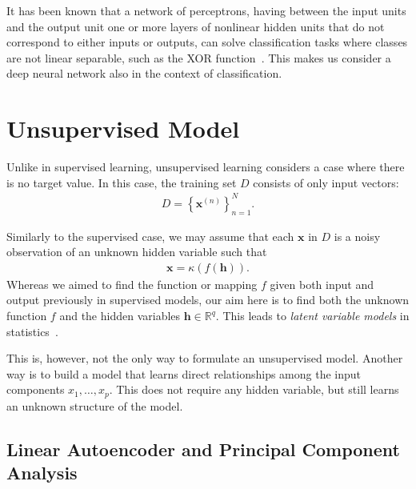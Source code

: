 \documentclass{now}
\newcommand{\vect}[1]{\mathbf{#1}}
\newcommand{\vh}[0]{\vect{h}}
\newcommand{\vx}[0]{\vect{x}}
\newcommand{\RR}[0]{\mathbb{R}}
\begin{document}
It has been known that a network of perceptrons, having between the input units
and the output unit one or more layers of nonlinear hidden units that do not
correspond to either inputs or outputs, can solve classification tasks where
classes are not linear separable, such as the XOR function~\citep[see,
e.g.,][]{Touretzky1989}. This makes us consider a deep neural network
also in the context of classification.




\section{Unsupervised Model}
\label{sec:unsupervised_model}

Unlike in supervised learning, unsupervised learning considers a case where
there is no target value.  In this case, the training set $D$ consists of only
input vectors:
\begin{align}
    \label{eq:unsup_train}
    D=\left\{ \vx^{(n)} \right\}_{n=1}^N.
\end{align}

Similarly to the supervised case, we may assume that each $\vx$ in $D$ is a
noisy observation of an unknown hidden variable such that
\begin{align}
    \label{eq:lvm}
    \vx = \kappa(f(\vh)).
\end{align}
Whereas we aimed to find the function or mapping $f$ given both input and
output previously in supervised models, our aim here is to find both the
unknown function $f$ and the hidden variables $\vh \in \RR^q$. This leads to
\textit{latent variable models} in statistics~\citep[see, e.g.,][]{Murphy2012}.

This is, however, not the only way to formulate an unsupervised model. Another
way is to build a model that learns direct relationships among the input
components $x_1, \dots, x_p$. This does not require any hidden variable, but
still learns an unknown structure of the model.

\subsection{Linear Autoencoder and Principal Component Analysis}
\label{sec:linear_autoencoder}
\end{document}
